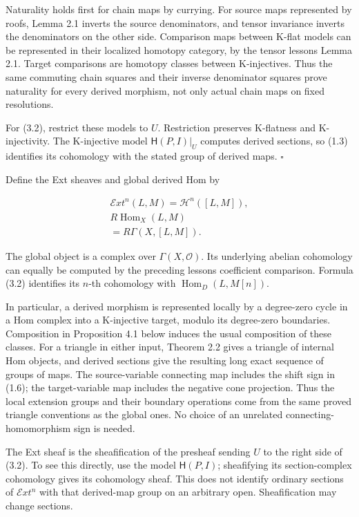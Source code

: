 \documentclass[
  english,
  11pt,
  a4paper,
]{article}
\begin{document}
Naturality holds first for chain maps by currying. For source maps
represented by roofs, Lemma 2.1 inverts the source denominators, and
tensor invariance inverts the denominators on the other side. Comparison
maps between K-flat models can be represented in their localized
homotopy category, by the tensor lesson\textquotesingle s Lemma 2.1.
Target comparisons are homotopy classes between K-injectives. Thus the
same commuting chain squares and their inverse denominator squares prove
naturality for every derived morphism, not only actual chain maps on
fixed resolutions.

For (3.2), restrict these models to \(U\). Restriction preserves
K-flatness and K-injectivity. The K-injective model
\(\mathsf H(P,I)|_U\) computes derived sections, so (1.3) identifies its
cohomology with the stated group of derived maps. \(\square\)

Define the Ext sheaves and global derived Hom by

\[\begin{gathered}
\mathcal Ext^n(L,M)=\mathcal H^n([L,M]),\\
R\operatorname{Hom}_X(L,M)\\
=R\Gamma(X,[L,M]).
\end{gathered}
\tag{3.3}\]

The global object is a complex over \(\Gamma(X,\mathcal O)\). Its
underlying abelian cohomology can equally be computed by the preceding
lesson\textquotesingle s coefficient comparison. Formula (3.2)
identifies its \(n\)-th cohomology with
\(\operatorname{Hom}_D(L,M[n])\).

In particular, a derived morphism is represented locally by a
degree-zero cycle in a Hom complex into a K-injective target, modulo its
degree-zero boundaries. Composition in Proposition 4.1 below induces the
usual composition of these classes. For a triangle in either input,
Theorem 2.2 gives a triangle of internal Hom objects, and derived
sections give the resulting long exact sequence of groups of maps. The
source-variable connecting map includes the shift sign in (1.6); the
target-variable map includes the negative cone projection. Thus the
local extension groups and their boundary operations come from the same
proved triangle conventions as the global ones. No choice of an
unrelated connecting-homomorphism sign is needed.

The Ext sheaf is the sheafification of the presheaf sending \(U\) to the
right side of (3.2). To see this directly, use the model
\(\mathsf H(P,I)\); sheafifying its section-complex cohomology gives its
cohomology sheaf. This does not identify ordinary sections of
\(\mathcal Ext^n\) with that derived-map group on an arbitrary open.
Sheafification may change sections.
\end{document}
